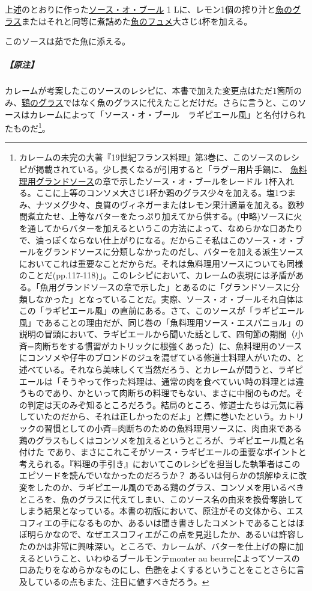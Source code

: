 \begin{recette}
上述のとおりに作った\protect\hyperlink{sauce-au-beurre}{ソース・オ・ブール}
1
Lに、レモン1個の搾り汁と\protect\hyperlink{glace-de-poisson}{魚のグラス}またはそれと同等に煮詰めた\protect\hyperlink{fumet-de-poisson}{魚のフュメ}大さじ4杯を加える。

このソースは茹でた魚に添える。

\hypertarget{nota-sauce-laguipiere}{%
\subparagraph{【原注】}\label{nota-sauce-laguipiere}}

カレームが考案したこのソースのレシピに、本書で加えた変更点はただ1箇所のみ、\protect\hyperlink{glace-de-volaille}{鶏のグラス}ではなく魚のグラスに代えたことだけだ。さらに言うと、このソースはカレームによって「ソース・オ・ブール　ラギピエール風」と名付けられたものだ\footnote{カレームの未完の大著『19世紀フランス料理』第3巻に、このソースのレシピが掲載されている。少し長くなるが引用すると「ラグー用片手鍋に、
  \ul{魚料理用グランドソース}の章で示したソース・オ・ブールをレードル
  1杯入れる。ここに上等のコンソメ大さじ1杯か鶏のグラス少々を加える。塩1つまみ、ナツメグ少々、良質のヴィネガーまたはレモン果汁適量を加える。数秒間煮立たせ、上等なバターをたっぷり加えてから供する。(中略)ソースに火を通してからバターを加えるというこの方法によって、なめらかな口あたりで、油っぽくならない仕上がりになる。だからこそ私はこのソース・オ・ブールをグランドソースに分類しなかったのだし、バターを加える派生ソースにおいてこれは重要なことだからだ。それは魚料理用ソースについても同様のことだ(pp.117-118)」。このレシピにおいて、カレームの表現には矛盾がある。「魚用グランドソースの章で示した」とあるのに「グランドソースに分類しなかった」となっていることだ。実際、ソース・オ・ブールそれ自体はこの「ラギピエール風」の直前にある。さて、このソースが「ラギピエール風」であることの理由だが、同じ巻の「魚料理用ソース・エスパニョル」の説明の冒頭において、ラギピエールから聞いた話として、四旬節の期間（小斉=肉断ちをする慣習がカトリックに根強くあった）に、魚料理用のソースにコンソメや仔牛のブロンドのジュを混ぜている修道士料理人がいたの、と述べている。それなら美味しくて当然だろう、とカレームが問うと、ラギピエールは「そうやって作った料理は、通常の肉を食べていい時の料理とは違うものであり、かといって肉断ちの料理でもない、まさに中間のものだ。その判定は天のみぞ知るところだろう。結局のところ、修道士たちは元気に暮していたのだから、それは正しかったのだよ」と煙に巻いたという。カトリックの習慣としての小斉=肉断ちのための魚料理用ソースに、肉由来である鶏のグラスもしくはコンソメを加えるというところが、ラギピエール風と名付けた
  であり、まさにこれこそがソース・ラギピエールの重要なポイントと考えられる。『料理の手引き』においてこのレシピを担当した執筆者はこのエピソードを読んでいなかったのだろうか？
  あるいは何らかの誤解ゆえに改変をしたのか、ラギピエール風のである鶏のグラス、コンソメを用いるべきところを、魚のグラスに代えてしまい、このソース名の由来を換骨奪胎してしまう結果となっている。本書の初版において、原注がその文体から、エスコフィエの手になるものか、あるいは聞き書きしたコメントであることはほぼ明らかなので、なぜエスコフィエがこの点を見逃したか、あるいは許容したのかは非常に興味深い。ところで、カレームが、バターを仕上げの際に加えるということ、いわゆるブールモンテmonter
  au
  beurreによってソースの口あたりをなめらかなものにし、色艶をよくするということをことさらに言及しているの点もまた、注目に値すべきだろう。}。


\end{recette}
